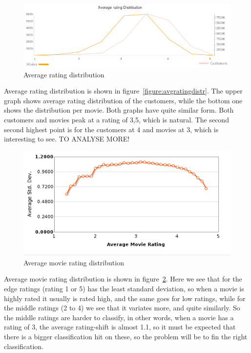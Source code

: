 \begin{figure}[H]
\includegraphics[width=5in]{image/avgratdistrover.png}
\centering
\caption{Average rating distribution}
\label{figure:avgratdistrover}
\end{figure}


Average rating distribution is shown in figure~\ref{figure:avgratingdistr}. The upper graph shows average rating distribution of the customers, while the bottom one shows the distribution per movie. Both graphs have quite similar form. Both customers and movies peak at a rating of 3,5, which is natural. The second second highest point is for the customers at 4 and movies at 3, which is interesting to see. TO ANALYSE MORE!


\begin{figure}[H]
\includegraphics[width=5in]{image/avgmovierating.png}
\centering
\caption{Average movie rating distribution}
\label{figure:avgmovierating}
\end{figure}

Average movie rating distribution is shown in figure~\ref{figure:avgmovierating}. Here we see that for the edge ratings (rating 1 or 5) has the least standard deviation, so when a movie is highly rated it usually is rated high, and the same goes for low ratings, while for the middle ratings (2 to 4) we see that it variates more, and quite similarly. So the middle ratings are harder to classify, in other words, when a movie has a rating of 3, the average rating-shift is almost 1.1, so it must be expected that there is a bigger classification hit on these, so the problem will be to fin the right classification.




